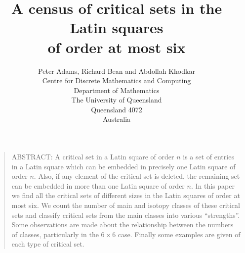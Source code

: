 \pagestyle{plain}





\setlength{\textwidth}{152.4truemm}
\setlength{\textheight}{228.6truemm}
\setlength{\oddsidemargin}{3.6mm}
\setlength{\evensidemargin}{3.6mm}
\setlength{\topmargin}{-12.5truemm}
\setlength{\parindent}{5.0truemm}

\newtheorem{theorem}{Theorem}
\newtheorem{lemma}[theorem]{Lemma}
\newtheorem{corollary}[theorem]{Corollary}
\newtheorem{example}[theorem]{Example}
\newtheorem{definition}[theorem]{Definition}
\newtheorem{remark}[theorem]{Remark}

\def\arraystretch{1.153}                 %
\def\n#1{\vbox to 3mm{\vspace{1mm}\vfill \hbox to 2.0mm{\hfill
             $#1$\hfill} \vfill }}


\title{A census of critical sets in the Latin squares \\
of order at most six}
\author{Peter Adams, Richard Bean and Abdollah Khodkar \\
Centre for Discrete Mathematics and Computing \\ 
Department of Mathematics\\ 
The University of Queensland\\ 
Queensland 4072\\ Australia} 

\date{ }



\maketitle


\vspace{15 pt}

\begin{quote}
        ABSTRACT: A critical set in a Latin square of order $n$ 
	is a set of entries in a Latin square which can be embedded 
	in precisely one Latin square of order $n$. Also, if any element 
	of the critical set is deleted, the remaining set can be 
	embedded in more than one Latin square of order $n$.
	In this paper we find all the critical sets of different 
	sizes in the Latin squares of order at most six. 
        We count the number of main and isotopy classes of these critical
        sets and classify critical sets from the main classes into various
        ``strengths''.  Some observations are made about the relationship
        between the numbers of classes, particularly in the $6 \times 6$
        case.  Finally some examples are given of each type of critical set.
\end{quote}

